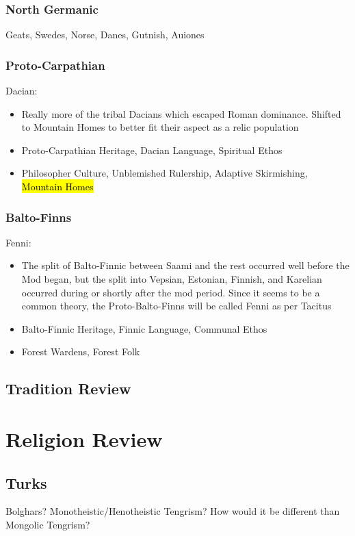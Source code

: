 \documentclass{article}
\begin{document}
	\subsubsection{North Germanic}
	Geats, Swedes, Norse, Danes, Gutnish, Auiones
	
	\subsubsection{Proto-Carpathian}
	Dacian:
	\begin{itemize}
		\item Really more of the tribal Dacians which escaped Roman dominance.
		Shifted to Mountain Homes to better fit their aspect as a relic population
		\item Proto-Carpathian Heritage, Dacian Language, Spiritual Ethos
		\item Philosopher Culture, Unblemished Rulership, Adaptive Skirmishing, \hl{Mountain Homes}
	\end{itemize}
	
	\subsubsection{Balto-Finns}
	Fenni:
	\begin{itemize}
		\item The split of Balto-Finnic between Saami and the rest occurred well before the Mod began, but the split into Vepsian, Estonian, Finnish, and Karelian occurred during or shortly after the mod period.
		Since it seems to be a common theory, the Proto-Balto-Finns will be called Fenni as per Tacitus
		\item Balto-Finnic Heritage, Finnic Language, Communal Ethos
		\item Forest Wardens, Forest Folk
	\end{itemize}
	
	\newpage
	
	\subsection{Tradition Review}
	\label{sec:culture_review:subsec:tradition_review}
	
	\section{Religion Review}
	\label{sec:religion_review}
	
	\subsection{Turks}
	\label{sec:religion_review:subsec:turks}
	Bolghars? Monotheistic/Henotheistic Tengrism? How would it be different than Mongolic Tengrism?
	
\end{document}
